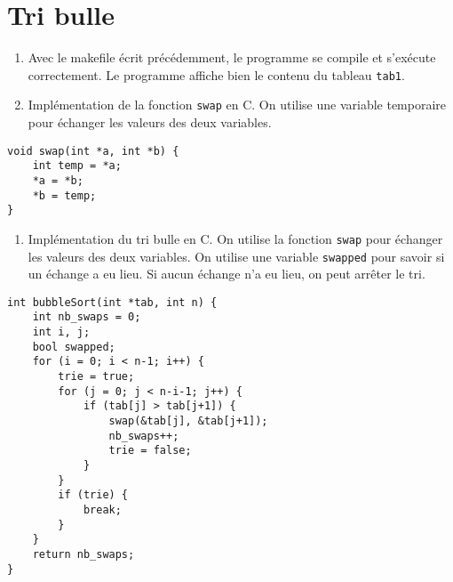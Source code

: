 \documentclass[12pt]{article}
\begin{document}
\section{Tri bulle}
\begin{enumerate}
    \item Avec le makefile écrit précédemment, le programme se compile et s'exécute correctement. Le programme affiche bien le contenu du tableau \texttt{tab1}.
    \item Implémentation de la fonction \texttt{swap} en C. On utilise une variable temporaire pour échanger les valeurs des deux variables.
\end{enumerate}
    \begin{lstlisting}[style=languageC, caption=Implémentation de la fonction swap]
void swap(int *a, int *b) {
    int temp = *a;
    *a = *b;
    *b = temp;
}
    \end{lstlisting}
\begin{enumerate}[resume]
    \item Implémentation du tri bulle en C. On utilise la fonction \texttt{swap} pour échanger les valeurs des deux variables. On utilise une variable \texttt{swapped} pour savoir si un échange a eu lieu. Si aucun échange n'a eu lieu, on peut arrêter le tri.
\end{enumerate}
    \begin{lstlisting}[style=languageC, caption=Implémentation optimisée du tri bulle]
int bubbleSort(int *tab, int n) {
    int nb_swaps = 0;
    int i, j;
    bool swapped;
    for (i = 0; i < n-1; i++) {
        trie = true;
        for (j = 0; j < n-i-1; j++) {
            if (tab[j] > tab[j+1]) {
                swap(&tab[j], &tab[j+1]);
                nb_swaps++;
                trie = false;
            }
        }
        if (trie) {
            break;
        }
    }
    return nb_swaps;
}
    \end{lstlisting}
\end{document}
